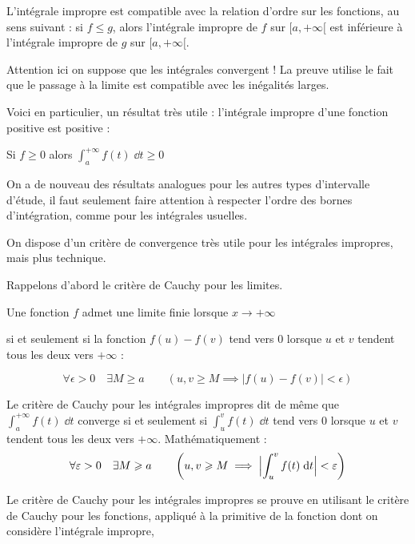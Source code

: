 \diapo

L'intégrale impropre 
est compatible avec la relation d'ordre sur les fonctions, 
au sens suivant : 
si $f\leq g$, alors l'intégrale impropre de $f$ sur $[a,+\infty[$ est 
inférieure à l'intégrale impropre de $g$ sur $[a,+\infty[$.

Attention ici on suppose que les intégrales convergent ! 
La preuve utilise le fait que le passage à la limite est 
compatible avec les inégalités larges.

\change

Voici en particulier, un résultat très utile : 
l'intégrale impropre d'une fonction positive est positive :

Si \quad $f\ge 0$ \quad alors \quad 
$\displaystyle \int_a^{+\infty} f(t)\;\dd t \ge 0$

On a de nouveau des résultats analogues pour les autres types 
d'intervalle d'étude, 
il faut seulement faire attention à respecter 
l'ordre des bornes d'intégration, 
comme pour les intégrales usuelles.


\diapo

On dispose d'un critère de convergence très utile pour les intégrales impropres, mais plus technique.

Rappelons d'abord le critère de Cauchy pour les limites.

Une fonction $f$ admet une limite finie lorsque $x\to +\infty$ 

si et seulement si la fonction $f(u)-f(v)$ tend vers $0$ lorsque $u$ et $v$ tendent tous les deux vers $+\infty$ :

$$\forall \epsilon>0\quad\exists M \ge a \qquad 
\left( u,v \ge M \implies \big|f(u)-f(v)\big|<\epsilon\right)$$



\change

Le critère de Cauchy pour les intégrales impropres dit de même que 
$\int_a^{+\infty} f(t) \; \dd t$ converge si et seulement si 
$\int_u^v f(t) \; \dd t$ tend vers $0$ lorsque $u$ et $v$ tendent 
tous les deux vers $+\infty$. Mathématiquement :
$$\forall \varepsilon>0  \quad \exists  M \geqslant a \qquad
\left( u,v \geqslant M \implies \Bigl|\int_u^v f(t) \;\mathrm{d} t\Bigr|<\varepsilon\right)$$

\change

Le critère de Cauchy pour les intégrales impropres 
se prouve en utilisant le critère de Cauchy pour les fonctions, 
appliqué à la primitive de la fonction dont on considère 
l'intégrale impropre,

